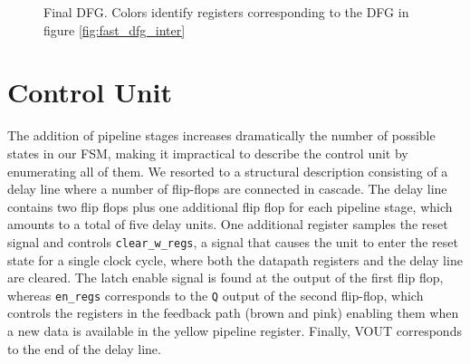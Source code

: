 \begin{figure}
	\caption{Final DFG. Colors identify registers corresponding to the DFG in figure \autoref{fig:fast_dfg_inter}}
	\label{fig:fast_dfg_final}
\end{figure}

\section{Control Unit}
The addition of pipeline stages increases dramatically the number of possible states in our FSM, making it impractical to describe the control unit by enumerating all of them. We resorted to a structural description consisting of a delay line where a number of flip-flops are connected in cascade. The delay line contains two flip flops plus one additional flip flop for each pipeline stage, which amounts to a total of five delay units. One additional register samples the reset signal and controls \texttt{clear\_w\_regs}, a signal that causes the unit to enter the reset state for a single clock cycle, where both the datapath registers and the delay line are cleared. The latch enable signal is found at the output of the first flip flop, whereas \texttt{en\_regs} corresponds to the \texttt{Q} output of the second flip-flop, which controls the registers in the feedback path (brown and pink) enabling them when a new data is available in the yellow pipeline register. Finally, VOUT corresponds to the end of the delay line.
